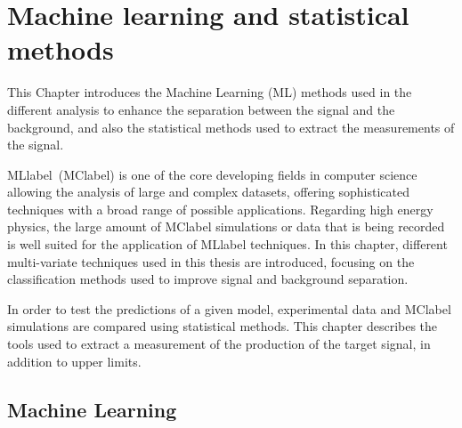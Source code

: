 \chapter{Machine learning and statistical methods}
\label{chapter:MLStat}

This Chapter introduces the Machine Learning (ML) methods used in the different analysis to enhance the separation between the signal and the background, and also the statistical methods used to extract the measurements of the signal.

\acrlong{MLlabel}~(\acrshort{MClabel}) is one of the core developing fields in computer science allowing the analysis of large and complex datasets, offering sophisticated techniques with a broad range of possible applications. Regarding high energy physics, the large amount of \acrshort{MClabel} simulations or data that is being recorded is well suited for the application of \acrshort{MLlabel} techniques. In this chapter, different multi-variate techniques used in this thesis are introduced, focusing on the classification methods used to improve signal and background separation.

In order to test the predictions of a given model, experimental data and \acrshort{MClabel} simulations are compared using statistical methods. This chapter describes the tools used to extract a measurement of the production of the target signal, in addition to upper limits.

\section{Machine Learning}

